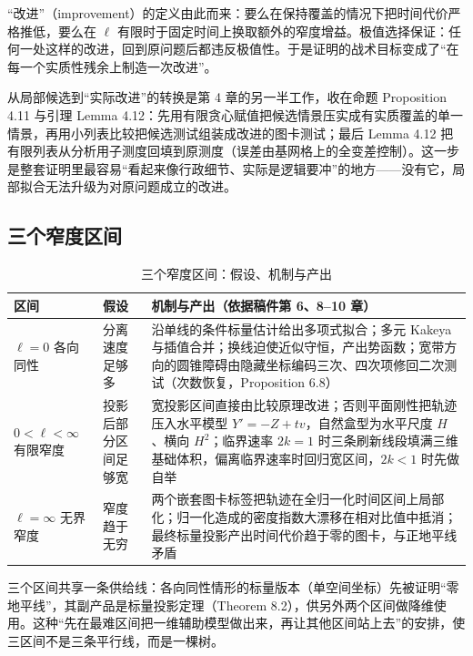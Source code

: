 “改进”（improvement）的定义由此而来：要么在保持覆盖的情况下把时间代价严格推低，要么在 $\ell$ 有限时于固定时间上换取额外的窄度增益。极值选择保证：任何一处这样的改进，回到原问题后都违反极值性。于是证明的战术目标变成了“在每一个实质性残余上制造一次改进”。

从局部候选到“实际改进”的转换是第 4 章的另一半工作，收在命题 Proposition 4.11 与引理 Lemma 4.12：先用有限贪心赋值把候选情景压实成有实质覆盖的单一情景，再用小列表比较把候选测试组装成改进的图卡测试；最后 Lemma 4.12 把有限列表从分析用子测度回填到原测度（误差由基网格上的全变差控制）。这一步是整套证明里最容易“看起来像行政细节、实际是逻辑要冲”的地方——没有它，局部拟合无法升级为对原问题成立的改进。

\subsection{三个窄度区间}

\begin{table}[t]
\centering
\caption{三个窄度区间：假设、机制与产出}
\label{tab:regimes}
\footnotesize
\begin{tabularx}{\textwidth}{@{}L{1.9cm}L{3.4cm}Y@{}}
\toprule
{}\textbf{区间} & \textbf{假设} & \textbf{机制与产出}（依据稿件第 6、8--10 章） \\
\midrule
$\ell=0$ 各向同性 & 分离速度足够多 & 沿单线的条件标量估计给出多项式拟合；多元 Kakeya 与插值合并；换线迫使近似守恒，产出势函数；宽带方向的圆锥障碍由隐藏坐标编码三次、四次项修回二次测试（次数恢复，Proposition 6.8） \\
$0<\ell<\infty$ 有限窄度 & 投影后部分区间足够宽 & 宽投影区间直接由比较原理改进；否则平面刚性把轨迹压入水平模型 $Y'=-Z+tv$，自然盒型为水平尺度 $H$、横向 $H^{2}$；临界速率 $2k=1$ 时三条刷新线段填满三维基础体积，偏离临界速率时回归宽区间，$2k<1$ 时先做自举 \\
$\ell=\infty$ 无界窄度 & 窄度趋于无穷 & 两个嵌套图卡标签把轨迹在全归一化时间区间上局部化；归一化造成的密度指数大漂移在相对比值中抵消；最终标量投影产出时间代价趋于零的图卡，与正地平线矛盾 \\
\bottomrule
\end{tabularx}
\end{table}

三个区间共享一条供给线：各向同性情形的标量版本（单空间坐标）先被证明“零地平线”，其副产品是标量投影定理（Theorem 8.2），供另外两个区间做降维使用。这种“先在最难区间把一维辅助模型做出来，再让其他区间站上去”的安排，使三区间不是三条平行线，而是一棵树。

